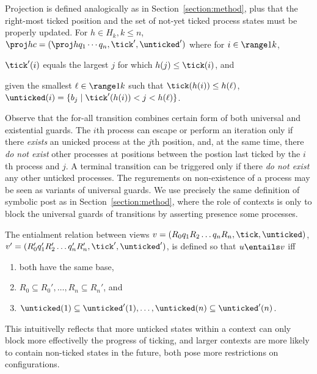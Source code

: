 %
Projection is defined analogically as in Section~\ref{section:method},
plus that the right-most ticked position and the set of not-yet ticked process states must be properly updated.
For $h\in H_k, k\leq n$,
$\proj h c = (\proj h {q_1\cdots q_n},\tick',\unticked')$ where
for $i\in \range 1 k$, 
\begin{inparaenum}[(i)]
\item
$\tick'(i)$ equals the largest $j$ for which $h(j)\leq \tick(i)$, and
\item
given the smallest $\ell\in\range 1 k$ such that $\tick(h(i))\leq h(\ell)$,
$\unticked(i) = \{b_j\mid \tick'(h(i)) < j < h(\ell)\}$. 
\end{inparaenum}
%

Observe that the for-all transition combines certain form of both universal and existential guards. The $i$th process can escape or perform an iteration only if there \emph{exists} an unicked process at the $j$th position, and, at the same time, there \emph{do not exist} other processes at positions between the postion last ticked by the $i$th process and $j$. A terminal transition can be triggered only if there \emph{do not exist} any other unticked processes. The regurements on non-existence of a process may be seen as variants of universal guards.
We use precisely the same definition of symbolic post as in Section~\ref{section:method}, where the role of contexts is only to block the universal guards of transitions by asserting presence some processes. 
%

The entialment relation between views 
$v = (R_0q_1R_2\ldots q_nR_{n},\tick,\unticked)$,
$v' = (R_0'q_1'R_2'\ldots q_n'R_{n}',\tick',\unticked')$,
is defined so that $u\entails v$ iff  
\begin{enumerate}
\item
both have the same base,
\item
$R_0\subseteq R_0',\ldots,R_n\subseteq R_n'$, and
\item
$\unticked(1)\subseteq \unticked'(1),\ldots,\unticked(n)\subseteq \unticked'(n)$.
\end{enumerate}
This intuitivelly reflects that
more unticked states within a context can only block more effectivelly the progress of ticking, and larger contexts are more likely to contain non-ticked states in the future, both pose more restrictions on configurations.


